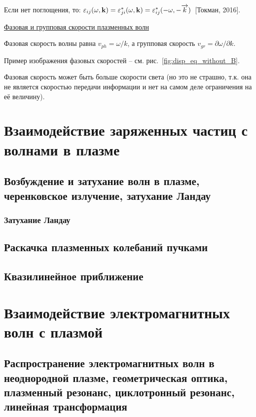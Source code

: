 \documentclass[10pt, a4paper]{article}
\newcommand{\Tokman}{~[Токман, 2016]}
\let\stdsection\section
\renewcommand\section{\newpage\stdsection}
\begin{document}
Если нет поглощения, то: $\varepsilon_{ij}(\omega, \vb{k})=\varepsilon_{ji}^{*}(\omega, \vb{k})=\varepsilon_{ij}^{*}(-\omega, -\overrightarrow{k})$\Tokman.

\uline{Фазовая и групповая скорости плазменных волн}

Фазовая скорость волны равна $v_{ph} = \omega/k$,
а групповая скорость $v_{gr} = \partial\omega/\partial k$.

Пример изображения фазовых скоростей -- см. рис.~\ref{fig:disp_eq_without_B}.

Фазовая скорость может быть больше скорости света (но это не страшно, т.к. она не является скоростью передачи информации и нет на самом деле ограничения на её величину).

\section{Взаимодействие заряженных частиц с волнами в плазме}
 
\subsection{Возбуждение и затухание волн в плазме, черенковское излучение, затухание Ландау}

\subsubsection{Затухание Ландау}
\label{subsubsec:Landau_damping}

\subsection{Раскачка плазменных колебаний пучками}

\subsection{Квазилинейное приближение}

\section{Взаимодействие электромагнитных волн с плазмой}

\subsection{Распространение электромагнитных волн в неоднородной плазме, геометрическая оптика, плазменный резонанс, циклотронный резонанс, линейная трансформация}
\end{document}
